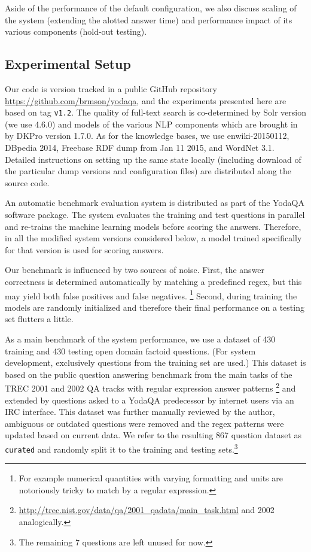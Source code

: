 Aside of the performance of the default configuration, we also discuss
scaling of the system (extending the alotted answer time) and performance
impact of its various components (hold-out testing).

\subsection{Experimental Setup}
\label{sec:expsetup}

Our code is version tracked in a public GitHub repository
\url{https://github.com/brmson/yodaqa}, and the experiments presented
here are based on tag \texttt{v1.2}.
The quality of full-text search is co-determined by Solr version
(we use 4.6.0) and models of the various NLP components which are brought
in by DKPro version 1.7.0.
As for the knowledge bases, we use enwiki-20150112, DBpedia 2014,
Freebase RDF dump from Jan 11 2015, and WordNet 3.1.
Detailed instructions on setting up the same state locally (including
download of the particular dump versions and configuration files) are
distributed along the source code.

An automatic benchmark evaluation system is distributed as part of the
YodaQA software package.  The system evaluates the training and test questions
in parallel and re-trains the machine learning models before scoring the answers.
Therefore, in all the modified system versions considered below, a model trained
specifically for that version is used for scoring answers.

Our benchmark is influenced by two sources of noise.
First, the answer correctness is determined automatically by matching a predefined regex,
but this may yield both false positives and false negatives.%
\footnote{For example numerical quantities with varying formatting and units are notoriously tricky to match by a regular expression.}
Second, during training the models are randomly initialized and therefore their final
performance on a testing set flutters a little.

As a main benchmark of the system performance, we use a dataset of 430 training
and 430 testing open domain factoid questions.
(For system development, exclusively questions from the training set are used.)
This dataset is based on the public question answering benchmark from
the main tasks of the TREC 2001 and 2002 QA tracks
with regular expression answer patterns%
\footnote{\url{http://trec.nist.gov/data/qa/2001_qadata/main_task.html} and 2002 analogically.}
and extended by questions asked
to a YodaQA predecessor by internet users via an IRC interface.
This dataset was further manually reviewed by the author,
ambiguous or outdated questions were removed
and the regex patterns were updated based on current data.
We refer to the resulting 867 question dataset as \texttt{curated} and
randomly split it to the training and testing sets.\footnote{The remaining
7 questions are left unused for now.}

